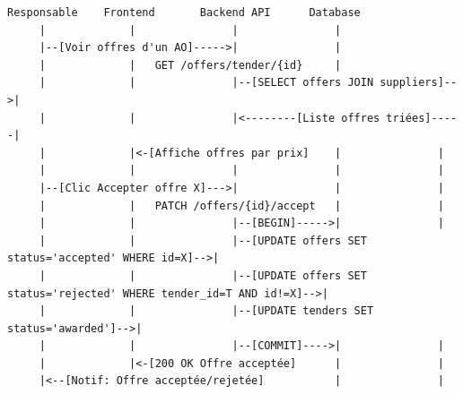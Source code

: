 \begin{verbatim}
Responsable    Frontend       Backend API      Database
     |             |               |               |
     |--[Voir offres d'un AO]----->|               |
     |             |   GET /offers/tender/{id}     |
     |             |               |--[SELECT offers JOIN suppliers]-->|
     |             |               |<--------[Liste offres triées]-----|
     |             |<-[Affiche offres par prix]    |               |
     |             |               |               |               |
     |--[Clic Accepter offre X]--->|               |               |
     |             |   PATCH /offers/{id}/accept   |               |
     |             |               |--[BEGIN]----->|               |
     |             |               |--[UPDATE offers SET status='accepted' WHERE id=X]-->|
     |             |               |--[UPDATE offers SET status='rejected' WHERE tender_id=T AND id!=X]-->|
     |             |               |--[UPDATE tenders SET status='awarded']-->|
     |             |               |--[COMMIT]---->|               |
     |             |<-[200 OK Offre acceptée]      |               |
     |<--[Notif: Offre acceptée/rejetée]           |               |
\end{verbatim}
